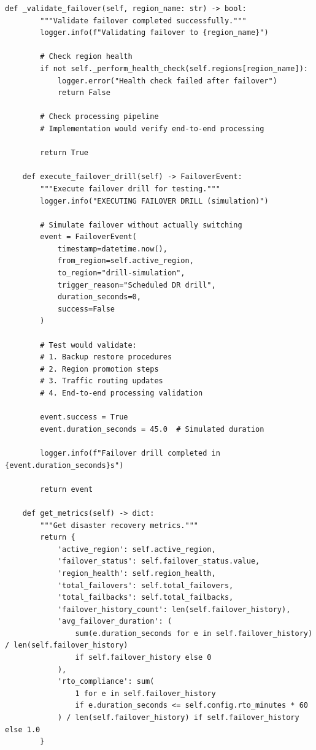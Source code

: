 \begin{lstlisting}[style=python, caption={Disaster Recovery Manager}]
    def _validate_failover(self, region_name: str) -> bool:
        """Validate failover completed successfully."""
        logger.info(f"Validating failover to {region_name}")

        # Check region health
        if not self._perform_health_check(self.regions[region_name]):
            logger.error("Health check failed after failover")
            return False

        # Check processing pipeline
        # Implementation would verify end-to-end processing

        return True

    def execute_failover_drill(self) -> FailoverEvent:
        """Execute failover drill for testing."""
        logger.info("EXECUTING FAILOVER DRILL (simulation)")

        # Simulate failover without actually switching
        event = FailoverEvent(
            timestamp=datetime.now(),
            from_region=self.active_region,
            to_region="drill-simulation",
            trigger_reason="Scheduled DR drill",
            duration_seconds=0,
            success=False
        )

        # Test would validate:
        # 1. Backup restore procedures
        # 2. Region promotion steps
        # 3. Traffic routing updates
        # 4. End-to-end processing validation

        event.success = True
        event.duration_seconds = 45.0  # Simulated duration

        logger.info(f"Failover drill completed in {event.duration_seconds}s")

        return event

    def get_metrics(self) -> dict:
        """Get disaster recovery metrics."""
        return {
            'active_region': self.active_region,
            'failover_status': self.failover_status.value,
            'region_health': self.region_health,
            'total_failovers': self.total_failovers,
            'total_failbacks': self.total_failbacks,
            'failover_history_count': len(self.failover_history),
            'avg_failover_duration': (
                sum(e.duration_seconds for e in self.failover_history) / len(self.failover_history)
                if self.failover_history else 0
            ),
            'rto_compliance': sum(
                1 for e in self.failover_history
                if e.duration_seconds <= self.config.rto_minutes * 60
            ) / len(self.failover_history) if self.failover_history else 1.0
        }


\end{lstlisting}
